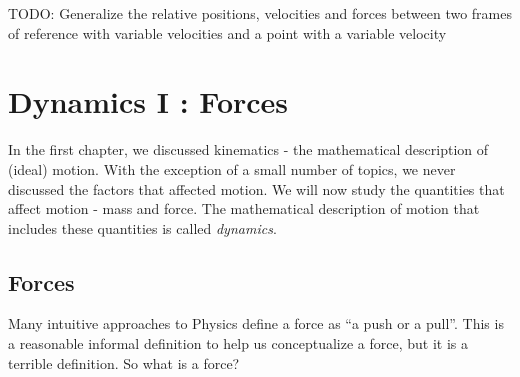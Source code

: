 TODO: Generalize the relative positions, velocities and forces between two frames of reference with variable velocities and a point with a variable velocity

\section{Dynamics I : Forces}

In the first chapter, we discussed kinematics - the mathematical description of (ideal) motion. With the exception of a small number of topics, we never discussed the factors that affected motion. We will now study the quantities that affect motion - mass and force. The mathematical description of motion that includes these quantities is called \textit{dynamics}.

\subsection{Forces}
\label{subsection:forces}


Many intuitive approaches to Physics define a force as ``a push or a pull''. This is a reasonable informal definition to help us conceptualize a force, but it is a terrible definition. So what is a force?

